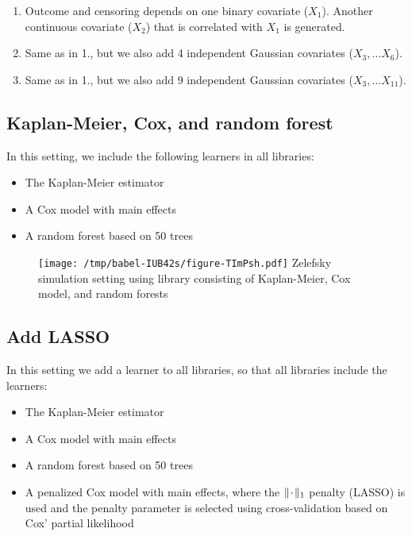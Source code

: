 \documentclass[a4paper,danish]{article}
\begin{document}
\begin{enumerate}
\item Outcome and censoring depends on one binary covariate (\(X_1\)). Another
continuous covariate (\(X_2\)) that is correlated with \(X_1\) is generated.
\item Same as in 1., but we also add 4 independent Gaussian covariates (\(X_3,
   \dots X_6\)).
\item Same as in 1., but we also add 9 independent Gaussian covariates (\(X_3,
   \dots X_{11}\)).
\end{enumerate}

\subsection{Kaplan-Meier, Cox, and random forest}
\label{sec:org4b465da}
In this setting, we include the following learners in all libraries:

\begin{itemize}
\item The Kaplan-Meier estimator
\item A Cox model with main effects
\item A random forest based on 50 trees
\end{itemize}

\begin{figure}[htbp]
\centering
\texttt{[image: /tmp/babel-IUB42s/figure-TImPsh.pdf]}
Zelefsky simulation setting using library consisting of Kaplan-Meier, Cox model, and random forests
\end{figure}

\clearpage

\subsection{Add LASSO}
\label{sec:org79abb0b}
In this setting we add a learner to all libraries, so that all libraries include
the learners:

\begin{itemize}
\item The Kaplan-Meier estimator
\item A Cox model with main effects
\item A random forest based on 50 trees
\item A penalized Cox model with main effects, where the \(\|\blank\|_1\) penalty
(LASSO) is used and the penalty parameter is selected using cross-validation
based on Cox' partial likelihood
\end{itemize}
\end{document}
